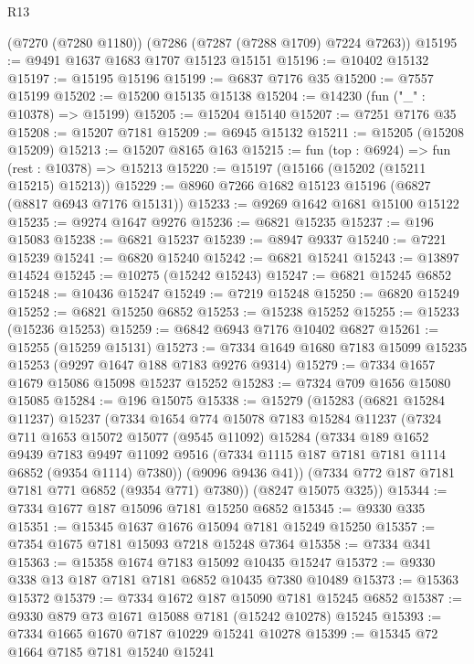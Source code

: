 \begin{lexlean}{R13}
\begin{coremodule}
    (@7270 (@7280 @1180))
    (@7286 (@7287 (@7288 @1709) @7224 @7263))
@15195 := @9491 @1637 @1683 @1707 @15123 @15151
@15196 := @10402 @15132
@15197 := @15195 @15196
@15199 := @6837 @7176 @35
@15200 := @7557 @15199
@15202 := @15200 @15135 @15138
@15204 := @14230 (fun ("_" : @10378) => @15199)
@15205 := @15204 @15140
@15207 := @7251 @7176 @35
@15208 := @15207 @7181
@15209 := @6945 @15132
@15211 := @15205 (@15208 @15209)
@15213 := @15207 @8165 @163
@15215 := fun (top : @6924) => fun (rest : @10378) => @15213
@15220 := @15197 (@15166 (@15202 (@15211 @15215) @15213))
@15229 := @8960 @7266 @1682 @15123 @15196 (@6827 (@8817 @6943 @7176 @15131))
@15233 := @9269 @1642 @1681 @15100 @15122
@15235 := @9274 @1647 @9276
@15236 := @6821 @15235
@15237 := @196 @15083
@15238 := @6821 @15237
@15239 := @8947 @9337
@15240 := @7221 @15239
@15241 := @6820 @15240
@15242 := @6821 @15241
@15243 := @13897 @14524
@15245 := @10275 (@15242 @15243)
@15247 := @6821 @15245 @6852
@15248 := @10436 @15247
@15249 := @7219 @15248
@15250 := @6820 @15249
@15252 := @6821 @15250 @6852
@15253 := @15238 @15252
@15255 := @15233 (@15236 @15253)
@15259 := @6842 @6943 @7176 @10402 @6827
@15261 := @15255 (@15259 @15131)
@15273 := @7334 @1649 @1680 @7183 @15099 @15235 @15253 (@9297 @1647 @188 @7183 @9276 @9314)
@15279 := @7334 @1657 @1679 @15086 @15098 @15237 @15252
@15283 := @7324 @709 @1656 @15080 @15085
@15284 := @196 @15075
@15338 := @15279
    (@15283
      (@6821 @15284 @11237)
      @15237
      (@7334
        @1654
        @774
        @15078
        @7183
        @15284
        @11237
        (@7324
          @711
          @1653
          @15072
          @15077
          (@9545 @11092)
          @15284
          (@7334
            @189
            @1652
            @9439
            @7183
            @9497
            @11092
            @9516
            (@7334 @1115 @187 @7181 @7181 @1114 @6852 (@9354 @1114) @7380))
          (@9096 @9436 @41))
        (@7334 @772 @187 @7181 @7181 @771 @6852 (@9354 @771) @7380))
      (@8247 @15075 @325))
@15344 := @7334 @1677 @187 @15096 @7181 @15250 @6852
@15345 := @9330 @335
@15351 := @15345 @1637 @1676 @15094 @7181 @15249 @15250
@15357 := @7354 @1675 @7181 @15093 @7218 @15248 @7364
@15358 := @7334 @341
@15363 := @15358 @1674 @7183 @15092 @10435 @15247
@15372 := @9330 @338 @13 @187 @7181 @7181 @6852 @10435 @7380 @10489
@15373 := @15363 @15372
@15379 := @7334 @1672 @187 @15090 @7181 @15245 @6852
@15387 := @9330 @879 @73 @1671 @15088 @7181 (@15242 @10278) @15245
@15393 := @7334 @1665 @1670 @7187 @10229 @15241 @10278
@15399 := @15345 @72 @1664 @7185 @7181 @15240 @15241

\end{coremodule}
\end{lexlean}
